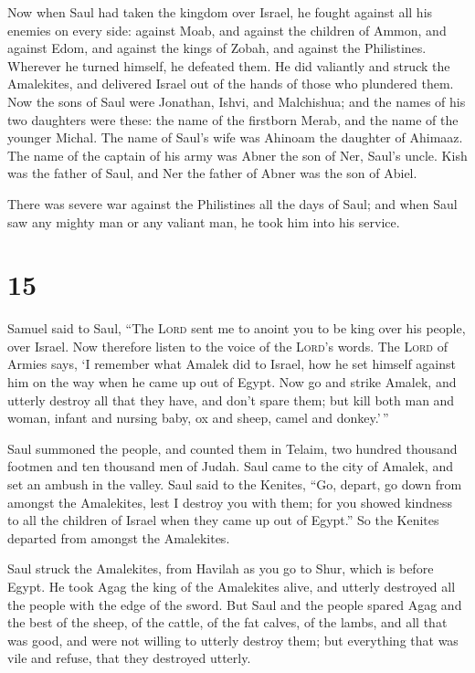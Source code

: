 Now when Saul had taken the kingdom over Israel, he
fought against all his enemies on every side: against Moab, and against
the children of Ammon, and against Edom, and against the kings of Zobah,
and against the Philistines. Wherever he turned himself, he defeated
them.  He did valiantly and struck the Amalekites, and
delivered Israel out of the hands of those who plundered them.
 Now the sons of Saul were Jonathan, Ishvi, and
Malchishua; and the names of his two daughters were these: the name of
the firstborn Merab, and the name of the younger Michal. 
The name of Saul's wife was Ahinoam the daughter of Ahimaaz. The name of
the captain of his army was Abner the son of Ner, Saul's uncle.
 Kish was the father of Saul, and Ner the father of Abner
was the son of Abiel.

 There was severe war against the Philistines all the
days of Saul; and when Saul saw any mighty man or any valiant man, he
took him into his service.

\hypertarget{section-14}{%
\section{15}\label{section-14}}

 Samuel said to Saul, ``The \textsc{Lord} sent me to
anoint you to be king over his people, over Israel. Now therefore listen
to the voice of the \textsc{Lord}'s words.  The
\textsc{Lord} of Armies says, `I remember what Amalek did to Israel, how
he set himself against him on the way when he came up out of Egypt.
 Now go and strike Amalek, and utterly destroy all that
they have, and don't spare them; but kill both man and woman, infant and
nursing baby, ox and sheep, camel and donkey.'\,''

 Saul summoned the people, and counted them in Telaim, two
hundred thousand footmen and ten thousand men of Judah. 
Saul came to the city of Amalek, and set an ambush in the valley.
 Saul said to the Kenites, ``Go, depart, go down from
amongst the Amalekites, lest I destroy you with them; for you showed
kindness to all the children of Israel when they came up out of Egypt.''
So the Kenites departed from amongst the Amalekites.

 Saul struck the Amalekites, from Havilah as you go to
Shur, which is before Egypt.  He took Agag the king of the
Amalekites alive, and utterly destroyed all the people with the edge of
the sword.  But Saul and the people spared Agag and the
best of the sheep, of the cattle, of the fat calves, of the lambs, and
all that was good, and were not willing to utterly destroy them; but
everything that was vile and refuse, that they destroyed utterly.

